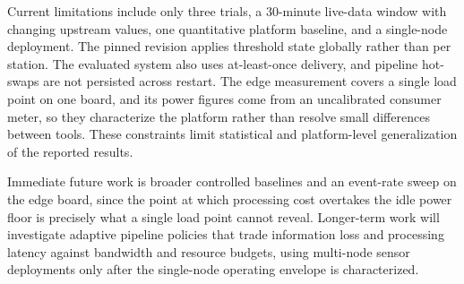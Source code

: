 \documentclass[conference]{IEEEtran}
\begin{document}
Current limitations include only three trials, a 30-minute live-data window with changing upstream values, one quantitative platform baseline, and a single-node deployment. The pinned revision applies threshold state globally rather than per station. The evaluated system also uses at-least-once delivery, and pipeline hot-swaps are not persisted across restart. The edge measurement covers a single load point on one board, and its power figures come from an uncalibrated consumer meter, so they characterize the platform rather than resolve small differences between tools. These constraints limit statistical and platform-level generalization of the reported results.

Immediate future work is broader controlled baselines and an event-rate sweep on the edge board, since the point at which processing cost overtakes the idle power floor is precisely what a single load point cannot reveal. Longer-term work will investigate adaptive pipeline policies that trade information loss and processing latency against bandwidth and resource budgets, using multi-node sensor deployments only after the single-node operating envelope is characterized.

\balance


\end{document}
